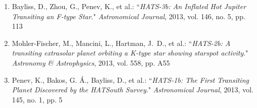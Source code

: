 \documentclass[12pt, a4paper]{article} %
\begin{document}
\begin{flushleft}
\begin{enumerate}
\item Bayliss, D., Zhou, G., Penev, K., et al.: ``\textit{HATS-3b: An Inflated Hot Jupiter Transiting an F-type Star}." \textit{Astronomical Journal}, 2013, vol. 146, no. 5, pp. 113
\item Mohler-Fischer, M., Mancini, L., Hartman, J.~D., et al.: ``\textit{HATS-2b: A transiting extrasolar planet orbiting a K-type star showing starspot activity}." \textit{Astronomy \& Astrophysics}, 2013, vol. 558, pp. A55
\item Penev, K., Bakos, G. Á., Bayliss, D., et al.: ``\textit{HATS-1b: The First Transiting Planet Discovered by the HATSouth Survey}." \textit{Astronomical Journal}, 2013, vol. 145, no. 1, pp. 5
\end{enumerate}
\end{flushleft}
\end{document}
